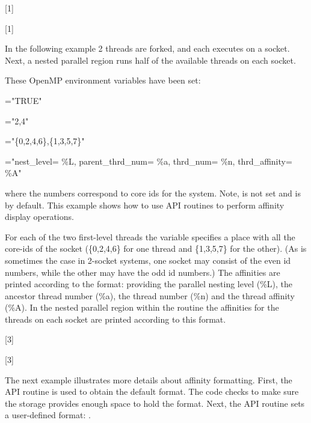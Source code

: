 [1]

[1]


In the following example 2 threads are forked, and each executes on a socket. Next,
a nested parallel region runs half of the available threads on each socket.

These OpenMP environment variables have been set:

\begin{compactitem}
\item {}="TRUE"
\item {}="2,4"
\item {}="\{0,2,4,6\},\{1,3,5,7\}"
\item {}="nest\_level= \%L, parent\_thrd\_num= \%a, thrd\_num= \%n, thrd\_affinity= \%A"
\end{compactitem}

where the numbers correspond to core ids for the system. Note,  is not
set and is  by default.  This example shows how to use API routines to
perform affinity display operations.

For each of the two first-level threads the  variable specifies
a place with all the core-ids of the socket (\{0,2,4,6\} for one thread and \{1,3,5,7\} for the other).
(As is sometimes the case in 2-socket systems, one socket may consist
of the even id numbers, while the other may have the odd id numbers.)  The affinities
are printed according to the  format: providing
the parallel nesting level (\%L), the ancestor thread number (\%a), the thread number (\%n)
and the thread affinity (\%A). In the nested parallel region within the  routine
the affinities for the threads on each socket are printed according to this format.

[3]

[3]

{}
The next example illustrates more details about affinity formatting.
First, the  API routine is used to 
obtain the default format. The code checks to make sure the storage 
provides enough space to hold the format.  
Next, the  API routine sets a user-defined 
format: .   


